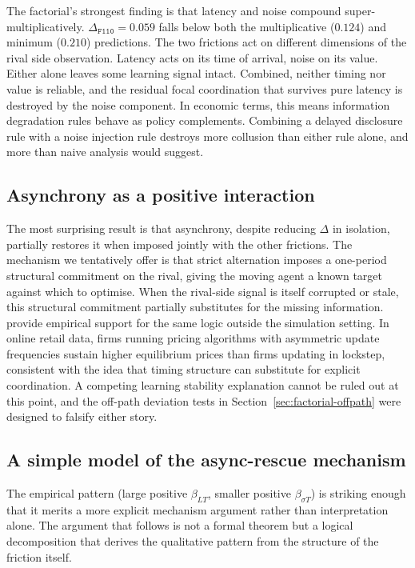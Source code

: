 The factorial's strongest finding is that latency and noise compound super-multiplicatively. $\Delta_{\texttt{F110}} = 0.059$ falls below both the multiplicative ($0.124$) and minimum ($0.210$) predictions. The two frictions act on different dimensions of the rival side observation. Latency acts on its time of arrival, noise on its value. Either alone leaves some learning signal intact. Combined, neither timing nor value is reliable, and the residual focal coordination that survives pure latency is destroyed by the noise component. In economic terms, this means information degradation rules behave as policy complements. Combining a delayed disclosure rule with a noise injection rule destroys more collusion than either rule alone, and more than naive analysis would suggest.

\subsection{Asynchrony as a positive interaction}

The most surprising result is that asynchrony, despite reducing $\Delta$ in isolation, partially restores it when imposed jointly with the other frictions. The mechanism we tentatively offer is that strict alternation imposes a one-period structural commitment on the rival, giving the moving agent a known target against which to optimise. When the rival-side signal is itself corrupted or stale, this structural commitment partially substitutes for the missing information. \citet{brown2023} provide empirical support for the same logic outside the simulation setting. In online retail data, firms running pricing algorithms with asymmetric update frequencies sustain higher equilibrium prices than firms updating in lockstep, consistent with the idea that timing structure can substitute for explicit coordination. A competing learning stability explanation cannot be ruled out at this point, and the off-path deviation tests in Section~\ref{sec:factorial-offpath} were designed to falsify either story.

\subsection{A simple model of the async-rescue mechanism}
\label{sec:async-rescue-mechanism}

The empirical pattern (large positive $\beta_{LT}$, smaller positive $\beta_{\sigma T}$) is striking enough that it merits a more explicit mechanism argument rather than interpretation alone. The argument that follows is not a formal theorem but a logical decomposition that derives the qualitative pattern from the structure of the friction itself.

